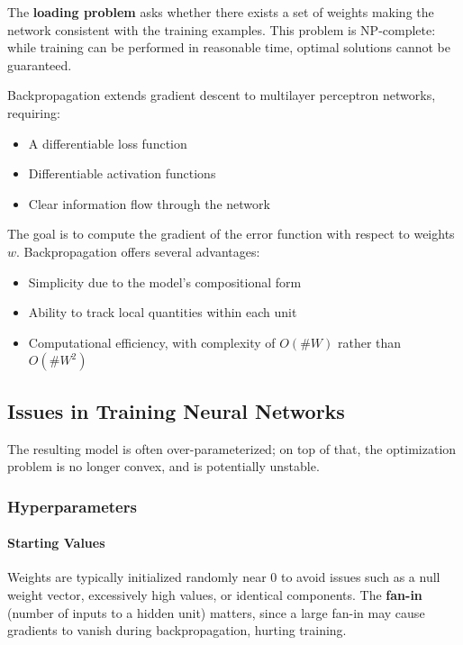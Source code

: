 The \textbf{loading problem} asks whether there exists a set of weights making the network consistent with the training examples. This problem is NP-complete: while training can be performed in reasonable time, optimal solutions cannot be guaranteed.

Backpropagation extends gradient descent to multilayer perceptron networks, requiring:
\begin{itemize}
    \item A differentiable loss function
    \item Differentiable activation functions
    \item Clear information flow through the network
\end{itemize}

The goal is to compute the gradient of the error function with respect to weights $w$. Backpropagation offers several advantages:
\begin{itemize}
    \item Simplicity due to the model's compositional form
    \item Ability to track local quantities within each unit
    \item Computational efficiency, with complexity of $O(\#W)$ rather than $O(\#W^2)$
\end{itemize}

\subsection{Issues in Training Neural Networks}

The resulting model is often over-parameterized; on top of that, the optimization problem is no longer convex, and is potentially unstable.


\subsubsection{Hyperparameters}

\paragraph{Starting Values}

Weights are typically initialized randomly near 0 to avoid issues such as a null weight vector, excessively high values, or identical components. The \textbf{fan-in} (number of inputs to a hidden unit) matters, since a large fan-in may cause gradients to vanish during backpropagation, hurting training.

